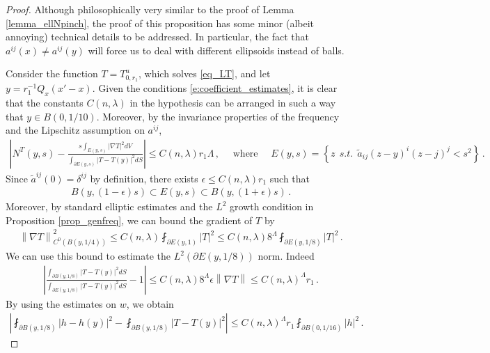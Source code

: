 \documentclass[11pt]{article}
\begin{document}
\begin{proof}
Although philosophically very similar to the proof of Lemma \ref{lemma_ellNpinch}, the proof of this proposition has some minor (albeit annoying) technical details to be addressed. In particular, the fact that $a^{ij}(x)\neq a^{ij}(y)$ will force us to deal with different ellipsoids instead of balls.
 
Consider the function $T=T^u_{0,r_1}$, which solves \eqref{eq_LT}, and let $y = r_1^{-1} Q_x(x'-x)$. Given the conditions \eqref{e:coefficient_estimates}, it is clear that the constants $C(n,\lambda)$ in the hypothesis can be arranged in such a way that $y\in B(0,1/10)$. Moreover, by the invariance properties of the frequency and the Lipschitz assumption on $a^{ij}$, 
\begin{gather}
{\left|{N^T(y,s) - \frac{s \int_{E(y,s)} {\left|{\nabla T}\right|}^2 dV }{\int_{\partial E(y,s)} {\left|{T-T(y)}\right|}^2 dS } }\right|} \leq C(n,\lambda) r_1 \Lambda\, , \quad \text{ where } \quad E(y,s) ={\left\{{z \ \ s.t. \ \ \tilde a_{ij} (z-y)^i (z-j)^j < s^2  }\right\}}\, .
\end{gather}
Since $\tilde a^{ij}(0)=\delta^{ij}$ by definition, there exists $\epsilon\leq C(n,\lambda) r_1$ such that
\begin{gather}
 B(y,(1-\epsilon) s )\subset E(y,s)\subset B(y,(1+\epsilon)s)\, .
\end{gather}
Moreover, by standard elliptic estimates and the $L^2$ growth condition in Proposition \ref{prop_genfreq}, we can bound the gradient of $T$ by
\begin{gather}
 {\left\|{\nabla T}\right\|}_{C^0(B(y,1/4))}^2\leq C(n,\lambda) \fint_{\partial E(y,1)} {\left|{T}\right|}^2 \leq C(n,\lambda) 8^\Lambda \fint_{\partial E(y,1/8)} {\left|{T}\right|}^2     \, .
\end{gather}
We can use this bound to estimate the $L^2(\partial E(y,1/8))$ norm. Indeed
\begin{gather}
 {\left|{\frac{\int_{\partial B(y,1/8)} {\left|{T-T(y)}\right|}^2 dS }{\int_{\partial E(y,1/8)} {\left|{T-T(y)}\right|}^2 dS } -1 }\right|}\leq C(n,\lambda) 8^\Lambda \epsilon {\left\|{\nabla T}\right\|} \leq C(n,\lambda)^\Lambda r_1\, .
\end{gather}
By using the estimates on $w$, we obtain
\begin{gather}
 {\left|{{\fint_{\partial B(y,1/8)} {\left|{h-h(y)}\right|}^2 } - {\fint_{\partial B(y,1/8)} {\left|{T-T(y)}\right|}^2  }}\right|}\leq C(n,\lambda)^\Lambda r_1 \fint_{\partial B(0,1/16)} {\left|{h}\right|}^2\, .

\end{gather}
\end{proof}
\end{document}

